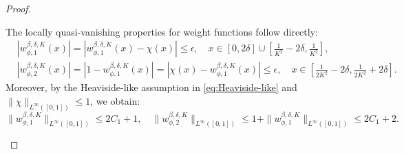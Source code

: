 \documentclass[11pt]{article}
\begin{document}
\begin{proof}
\begin{itemize}
        The locally quasi-vanishing properties for weight functions follow directly:
        \begin{equation*}
            \begin{aligned}
                &|w_{\phi,1}^{\beta, \delta, K}(x)| =|w_{\phi,1}^{\beta, \delta, K}(x) - \chi(x)| \leq \epsilon, \quad x \in [0, 2\delta] \cup \left[\frac{1}{K^2}- 2\delta, \frac{1}{K^2} \right], \\
                &|w_{\phi,2}^{\beta, \delta, K}(x)| = |1 - w_{\phi,1}^{\beta, \delta, K}(x)| = |\chi(x) - w_{\phi,1}^{\beta, \delta, K}(x)| \leq \epsilon, \quad x \in \left[\frac{1}{2K^2} - 2\delta, \frac{1}{2K^2}+2 \delta \right].
            \end{aligned}
        \end{equation*}
        Moreover, by the Heaviside-like assumption in \eqref{eq:Heaviside-like} and $\|\chi\|_{L^{\infty}([0,1])} \leq 1 $, we obtain:
        \begin{equation*}
            \|w_{\phi,1}^{\beta, \delta, K}\|_{L^{\infty}([0,1])} \leq 2C_1 + 1, \quad  \|w_{\phi,2}^{\beta, \delta, K}\|_{L^{\infty}([0,1])} \leq 1 +   \|w_{\phi,1}^{\beta, \delta, K}\|_{L^{\infty}([0,1])} \leq 2C_1 +2.
        \end{equation*}


\end{itemize}
\end{proof}
\end{document}
